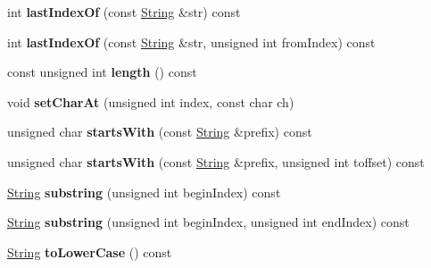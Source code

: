 \begin{DoxyCompactItemize}
\item 
int {\bfseries last\+Index\+Of} (const \hyperlink{class_string}{String} \&str) const \hypertarget{class_string_a1fc027b0c1160e9e9e9460f68021f0bd}{}\label{class_string_a1fc027b0c1160e9e9e9460f68021f0bd}

\item 
int {\bfseries last\+Index\+Of} (const \hyperlink{class_string}{String} \&str, unsigned int from\+Index) const \hypertarget{class_string_a5f060c3fb78317d673b4eea9d3f33aef}{}\label{class_string_a5f060c3fb78317d673b4eea9d3f33aef}

\item 
const unsigned int {\bfseries length} () const \hypertarget{class_string_a61d8c8330af43b5f6ccbf11a92457b44}{}\label{class_string_a61d8c8330af43b5f6ccbf11a92457b44}

\item 
void {\bfseries set\+Char\+At} (unsigned int index, const char ch)\hypertarget{class_string_a5f276a61766d25a1c03e74905261ad99}{}\label{class_string_a5f276a61766d25a1c03e74905261ad99}

\item 
unsigned char {\bfseries starts\+With} (const \hyperlink{class_string}{String} \&prefix) const \hypertarget{class_string_a151339707b7370176a46b9edef5c3bdc}{}\label{class_string_a151339707b7370176a46b9edef5c3bdc}

\item 
unsigned char {\bfseries starts\+With} (const \hyperlink{class_string}{String} \&prefix, unsigned int toffset) const \hypertarget{class_string_a4e085c4865b752cb236ffb23918094e5}{}\label{class_string_a4e085c4865b752cb236ffb23918094e5}

\item 
\hyperlink{class_string}{String} {\bfseries substring} (unsigned int begin\+Index) const \hypertarget{class_string_ad27c108b34b07c6785e194c2d968bb1c}{}\label{class_string_ad27c108b34b07c6785e194c2d968bb1c}

\item 
\hyperlink{class_string}{String} {\bfseries substring} (unsigned int begin\+Index, unsigned int end\+Index) const \hypertarget{class_string_aea448757a5dbe286cb522e1b02682d89}{}\label{class_string_aea448757a5dbe286cb522e1b02682d89}

\item 
\hyperlink{class_string}{String} {\bfseries to\+Lower\+Case} () const \hypertarget{class_string_a17f872d6422e11d2b9c3902f800dc19c}{}\label{class_string_a17f872d6422e11d2b9c3902f800dc19c}


\end{DoxyCompactItemize}

